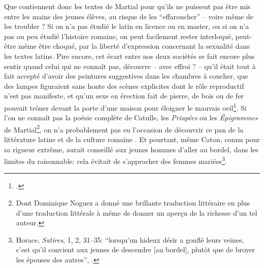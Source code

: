 Que contiennent donc les textes de Martial pour qu'ils ne puissent pas être mis entre les mains des jeunes élèves, au risque de les \enquote{effaroucher} -- voire même de les troubler ? Si on n'a pas étudié le latin en licence ou en master, ou si on n'a pas ou peu étudié l'histoire romaine, on peut facilement rester interloqué, peut-être même être choqué, par la liberté d'expression concernant la sexualité dans les textes latins. Pire encore, cet écart entre nos deux sociétés
se fait encore plus sentir quand celui qui ne connaît pas, découvre -- avec effroi ?
-- qu'il était tout à fait accepté d'avoir des peintures suggestives dans les chambres à coucher, que des lampes figuraient sans honte des scènes explicites dont le rôle reproductif n'est pas manifeste, et qu'un sexe en érection fait de pierre, de bois ou de fer pouvait trôner devant la porte d'une maison pour éloigner le mauvais oeil\footcite{parker_bells_2018}. Si l'on ne connaît pas la poésie complète de Catulle, les \textit{Priapées} ou les \textit{Épigrammes} de Martial\footnote{Dont Dominique Noguez a donné une brillante traduction littéraire en plus d'une traduction littérale à même de donner un aperçu de la richesse d'un tel auteur.}, on n'a probablement pas eu l'occasion de découvrir ce pan de la littérature latine et de la culture romaine
. Et pourtant, même Caton, connu pour sa rigueur extrême, aurait conseillé aux jeunes hommes d'aller au bordel, dans les limites du raisonnable: cela évitait de s'approcher des femmes mariées\footnote{Horace, \textit{Satires}, 1, 2, 31--35: \enquote{lorsqu'un hideux désir a gonflé leurs veines, c'est qu'il convient aux jeunes de descendre [au bordel], plutôt que de broyer les épouses des autres}, \textcite[p.~30]{puccini_delbey_vie_2010}.}.

